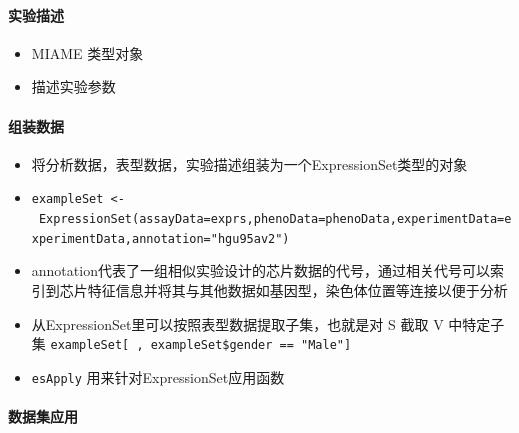 \documentclass[]{book}
\providecommand{\tightlist}{%
  \setlength{\itemsep}{0pt}\setlength{\parskip}{0pt}}
\let\oldparagraph\paragraph
\renewcommand{\paragraph}[1]{\oldparagraph{#1}\mbox{}}
\begin{document}
\hypertarget{ux5b9eux9a8cux63cfux8ff0}{%
\paragraph{实验描述}\label{ux5b9eux9a8cux63cfux8ff0}}

\begin{itemize}
\tightlist
\item
  MIAME 类型对象
\item
  描述实验参数
\end{itemize}

\hypertarget{ux7ec4ux88c5ux6570ux636e}{%
\paragraph{组装数据}\label{ux7ec4ux88c5ux6570ux636e}}

\begin{itemize}
\tightlist
\item
  将分析数据，表型数据，实验描述组装为一个ExpressionSet类型的对象
\item
  \texttt{exampleSet\ \textless{}-\ ExpressionSet(assayData=exprs,phenoData=phenoData,experimentData=experimentData,annotation="hgu95av2")}
\item
  annotation代表了一组相似实验设计的芯片数据的代号，通过相关代号可以索引到芯片特征信息并将其与其他数据如基因型，染色体位置等连接以便于分析
\item
  从ExpressionSet里可以按照表型数据提取子集，也就是对 S 截取 V 中特定子集 \texttt{exampleSet{[}\ ,\ exampleSet\$gender\ ==\ "Male"{]}}
\item
  \texttt{esApply} 用来针对ExpressionSet应用函数
\end{itemize}

\hypertarget{ux6570ux636eux96c6ux5e94ux7528}{%
\paragraph{数据集应用}\label{ux6570ux636eux96c6ux5e94ux7528}}
\end{document}
